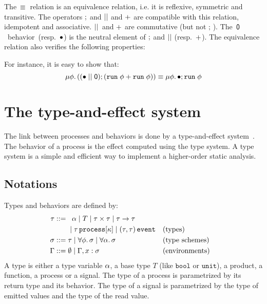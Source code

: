 \documentclass[9pt,preprint]{sigplanconf}
\newcommand{\sdeq}{::=}
\begin{document}
The~$\equiv$~relation is an equivalence relation, i.e. it is reflexive, symmetric and transitive. The operators $;$ and $ \mid\mid $ and $+$ are compatible with this relation, idempotent and associative. $ \mid\mid $~and $+$ are commutative (but not $;\,$). The~$\textsf{0}$~behavior~(resp.~$\bullet$) is the neutral element of $;$ and $ \mid\mid $ (resp.~$+$). The equivalence relation also verifies the following properties:
%

For instance, it is easy to show that:
\[
\mu \phi.\, ((\bullet \mid\mid \textsf{0}) ; (\mathtt{run}\; \phi + \mathtt{run}\; \phi))  \equiv  \mu \phi.\, \bullet ; \mathtt{run}\; \phi
\]

\section{The type-and-effect system}
\label{sec:type_system}

The link between processes and behaviors is done by a type-and-effect system~\cite{Lucassen:1988}. The behavior of a process is the effect computed using the type system. A type system is a simple and efficient way to implement a higher-order static analysis.

\subsection{Notations}

Types and behaviors are defined by:
\begin{align*}
\rt \sdeq &\;\;\; \rtvar \mid T \mid \rtprod{\rt}{\rt} \mid \rtarrow{\rt}{\rt} \\
    &\;\mid \rtproc{\rt}{\rk} \mid \rtsig{\rt}{\rt} && \text{(types)} \\
\rs \sdeq &\; \rt \mid \forall \effvar.\, \rs \mid \forall \rtvar.\, \rs && \text{(type schemes)} \\
\tyenv \sdeq&\; \emptyset \mid \tyenv \tyconcat x : \rs && \text{(environments)}
\end{align*}
A type is either a type variable $\alpha$, a base type $T$ (like $\mathtt{bool}$ or $\mathtt{unit}$), a product, a function, a process or a signal. The type of a process is parametrized by its return type and its behavior. The type of a signal is parametrized by the type of emitted values and the type of the read value.
\end{document}
